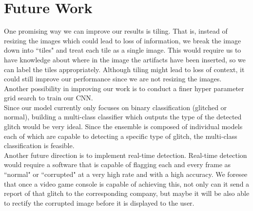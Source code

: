 \section{Future Work}
One promising way we can improve our results is tiling. That is, instead of resizing the images which could lead to loss of information, we break the image down into ``tiles" and treat each tile as a single image. This would require us to have knowledge about where in the image the artifacts have been inserted, so we can label the tiles appropriately. Although tiling might lead to loss of context, it could still improve our performance since we are not resizing the images.\\
Another possibility in improving our work is to conduct a finer hyper parameter grid search to train our CNN.\\

\noindent Since our model currently only focuses on binary classification (glitched or normal), building a multi-class classifier which outputs the type of the detected glitch would be very ideal. Since the ensemble is composed of individual models each of which are capable to detecting a specific type of glitch, the multi-class classification is feasible. \\

\noindent Another future direction is to implement real-time detection. Real-time detection would require a software that is capable of flagging each and every frame as ``normal" or ``corrupted" at a very high rate and with a high accuracy. We foresee that once a video game console is capable of achieving this, not only can it send a report of that glitch to the corresponding company, but maybe it will be also able to rectify the corrupted image before it is displayed to the user.



\endinput
